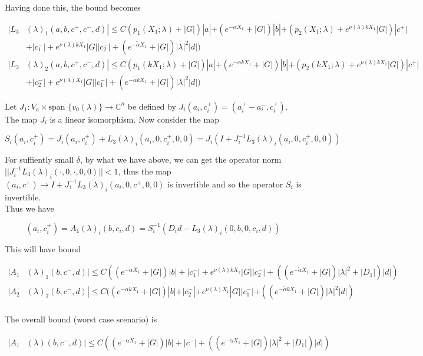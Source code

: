 \documentclass[12pt]{article}
\def\C{{\mathbb C}}
\begin{document}
\begin{enumerate}
Having done this, the bound becomes

\begin{align*}
|L_3&(\lambda)_1(a, b, c^+, c^-, d)| \leq C (p_1(X_1; \lambda) + |G|)|a| + (e^{-\alpha X_1} + |G|) |b| + ( p_2(X_1; \lambda) + e^{\nu(\lambda) k X_1 } |G|) |c^+| \\
&+ |c_1^-| + e^{\nu(\lambda)k X_1} |G||c_2^-| + (e^{-\tilde{\alpha} X_1} + |G|) |\lambda|^2 |d| ) \\
|L_3&(\lambda)_2(a, b, c^+, c^-, d)| \leq C (p_1(k X_1; \lambda) + |G|)|a| + (e^{-\alpha k X_1} + |G|) |b| + ( p_2(k X_1; \lambda) + e^{\nu(\lambda) k X_1 } |G|) |c^+| \\
&+ |c_2^-| + e^{\nu(\lambda)X_1} |G||c_1^-| + (e^{-\tilde{\alpha} k X_1} + |G|) |\lambda|^2 |d| )
\end{align*}

Let $J_1: V_a \times \text{span }\{v_0(\lambda)\} \rightarrow \C^n$ be defined by $J_i(a_i, c_i^+) = (a_i^+ - a_i^-, c_i^+)$. The map $J_i$ is a linear isomorphism. Now consider the map

\[
S_i(a_i, c_i^+) = J_i (a_i, c_i^+) + L_3(\lambda)_i(a_i, 0, c_i^+, 0, 0) = J_i( I + J_i^{-1} L_3(\lambda)_i(a_i, 0, c_i^+, 0, 0))
\]


For suffiently small $\delta$, by what we have above, we can get the operator norm $||J_i^{-1} L_3(\lambda)_i(\cdot, 0, \cdot, 0, 0)|| < 1$, thus the map $(a_i, c^+) \rightarrow I + J_1^{-1} L_3(\lambda)_i(a_i, 0, c^+, 0, 0)$ is invertible and so the operator $S_i$ is invertible.\\

Thus we have

\[
(a_i, c_i^+) = A_1(\lambda)_i(b, c_i, d) = S_i^{-1}(D_i d - L_3(\lambda)_i(0, b, 0, c_i, d))
\]

This will have bound

\begin{align*}
|A_1&(\lambda)_1(b, c^-, d)| \leq C ((e^{-\alpha X_1} + |G|) |b| + |c_1^-| + e^{\nu(\lambda)k X_1} |G||c_2^-| + ((e^{-\tilde{\alpha} X_1} + |G|) |\lambda|^2 + |D_1| )|d| ) \\
|A_2&(\lambda)_2(b, c^-, d)| \leq C ((e^{-\alpha k X_1} + |G|) |b| + |c_2^-| + e^{\nu(\lambda) X_1} |G||c_1^-| + ((e^{-\tilde{\alpha} k X_1} + |G|) |\lambda|^2 |d| ) \\
\end{align*}

The overall bound (worst case scenario) is 

\begin{align*}
|A_1&(\lambda)(b, c^-, d)| \leq C( (e^{-\alpha X_1} + |G|) |b| + |c^-| + ((e^{-\tilde{\alpha} X_1} + |G|) |\lambda|^2 + |D_1|) |d| )
\end{align*}


\end{enumerate}
\end{document}

